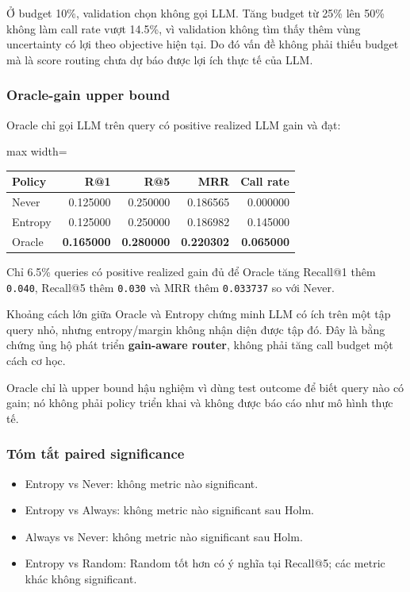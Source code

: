 Ở budget 10\%, validation chọn không gọi LLM. Tăng budget từ 25\% lên 50\% không làm call rate vượt 14.5\%, vì validation không tìm thấy thêm vùng uncertainty có lợi theo objective hiện tại. Do đó vấn đề không phải thiếu budget mà là score routing chưa dự báo được lợi ích thực tế của LLM.

\subsubsection*{Oracle-gain upper bound}

Oracle chỉ gọi LLM trên query có positive realized LLM gain và đạt:

\begin{table}[!htbp]
\centering
\scriptsize
\setlength{\tabcolsep}{2.5pt}
\begin{adjustbox}{max width=\textwidth}
\begin{tabular}{@{}lrrrr@{}}
\toprule
Policy & R@1 & R@5 & MRR & Call rate \\
\midrule
Never & 0.125000 & 0.250000 & 0.186565 & 0.000000 \\
Entropy & 0.125000 & 0.250000 & 0.186982 & 0.145000 \\
Oracle & \textbf{0.165000} & \textbf{0.280000} & \textbf{0.220302} & \textbf{0.065000} \\
\bottomrule
\end{tabular}
\end{adjustbox}
\end{table}

Chỉ 6.5\% queries có positive realized gain đủ để Oracle tăng Recall@1 thêm \texttt{0.040}, Recall@5 thêm \texttt{0.030} và MRR thêm \texttt{0.033737} so với Never.

Khoảng cách lớn giữa Oracle và Entropy chứng minh LLM có ích trên một tập query nhỏ, nhưng entropy/margin không nhận diện được tập đó. Đây là bằng chứng ủng hộ phát triển \textbf{gain-aware router}, không phải tăng call budget một cách cơ học.

Oracle chỉ là upper bound hậu nghiệm vì dùng test outcome để biết query nào có gain; nó không phải policy triển khai và không được báo cáo như mô hình thực tế.

\subsubsection*{Tóm tắt paired significance}

\begin{itemize}
\item Entropy vs Never: không metric nào significant.
\item Entropy vs Always: không metric nào significant sau Holm.
\item Always vs Never: không metric nào significant sau Holm.
\item Entropy vs Random: Random tốt hơn có ý nghĩa tại Recall@5; các metric khác
không significant.

\end{itemize}


